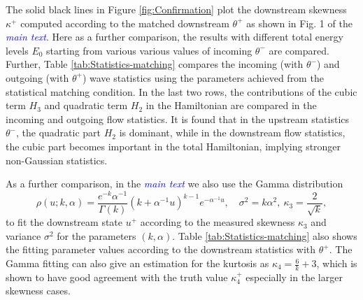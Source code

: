 \documentclass[9pt,twoside,lineno]{pnas-new}
\theoremstyle{plain}
\theoremstyle{plain}
\begin{document}
The solid black lines in Figure \ref{fig:Confirmation} plot the downstream
skewness $\kappa^{+}$ computed according to the matched downstream
$\theta^{+}$ as shown in Fig. 1 of the \textcolor{blue}{\emph{main text}}. Here as
a further comparison, the results with different total energy levels
$E_{0}$ starting from various various values of incoming $\theta^{-}$
are compared. Further, Table \ref{tab:Statistics-matching} compares
the incoming (with $\theta^{-}$) and outgoing (with $\theta^{+}$)
wave statistics using the parameters achieved from the statistical
matching condition. In the last two rows, the contributions of the
cubic term $H_{3}$ and quadratic term $H_{2}$ in the Hamiltonian
are compared in the incoming and outgoing flow statistics. It is found
that in the upstream statistics $\theta^{-}$, the quadratic part
$H_{2}$ is dominant, while in the downstream flow statistics, the
cubic part becomes important in the total Hamiltonian, implying stronger
non-Gaussian statistics.

As a further comparison, in the \textcolor{blue}{\emph{main text}} we also use the Gamma
distribution 
\[
\rho\left(u;k,\alpha\right)=\frac{e^{-k}\alpha^{-1}}{\Gamma\left(k\right)}\left(k+\alpha^{-1}u\right)^{k-1}e^{-\alpha^{-1}u},\quad\sigma^{2}=k\alpha^{2},\:\kappa_{3}=\frac{2}{\sqrt{k}},
\]
to fit the downstream state $u^{+}$ according to the measured skewness $\kappa_3$ and variance $\sigma^2$ for the parameters $\left(k,\alpha\right)$.
Table \ref{tab:Statistics-matching} also shows the fitting parameter
values according to the downstream statistics with $\theta^{+}$.
The Gamma fitting can also give an estimation for the kurtosis as
$\kappa_{4}=\frac{6}{k}+3$, which is shown to have good agreement
with the truth value $\kappa_4^{+}$ especially in the larger skewness
cases.
\end{document}
